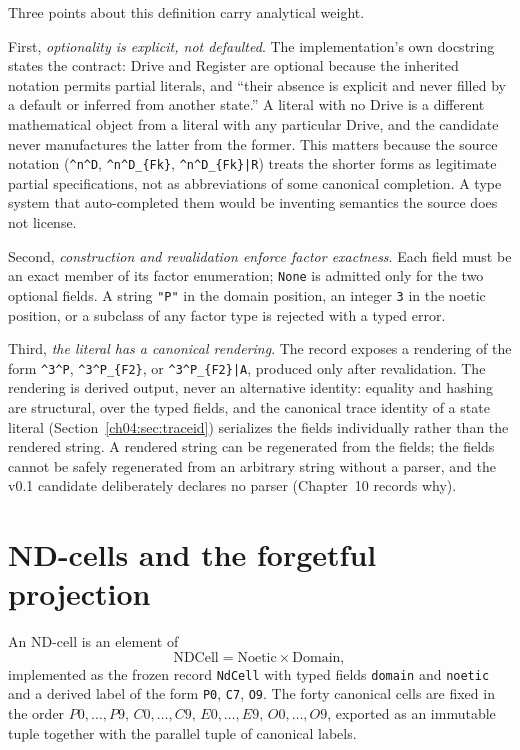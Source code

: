 Three points about this definition carry analytical weight.

First, \emph{optionality is explicit, not defaulted}. The implementation's
own docstring states the contract: Drive and Register are optional because
the inherited notation permits partial literals, and ``their absence is
explicit and never filled by a default or inferred from another state.''
A literal with no Drive is a different mathematical object from a literal
with any particular Drive, and the candidate never manufactures the latter
from the former. This matters because the source notation
(\texttt{\^{}n\^{}D}, \texttt{\^{}n\^{}D\_\{Fk\}},
\texttt{\^{}n\^{}D\_\{Fk\}|R}) treats the shorter forms as legitimate
partial specifications, not as abbreviations of some canonical completion.
A type system that auto-completed them would be inventing semantics the
source does not license.

Second, \emph{construction and revalidation enforce factor exactness}. Each
field must be an exact member of its factor enumeration; \texttt{None} is
admitted only for the two optional fields. A string \texttt{"P"} in the
domain position, an integer \texttt{3} in the noetic position, or a
subclass of any factor type is rejected with a typed error.

Third, \emph{the literal has a canonical rendering}. The record exposes a
rendering of the form \texttt{\^{}3\^{}P}, \texttt{\^{}3\^{}P\_\{F2\}}, or
\texttt{\^{}3\^{}P\_\{F2\}|A}, produced only after revalidation. The
rendering is derived output, never an alternative identity: equality and
hashing are structural, over the typed fields, and the canonical trace
identity of a state literal (Section~\ref{ch04:sec:traceid}) serializes the
fields individually rather than the rendered string. A rendered string can
be regenerated from the fields; the fields cannot be safely regenerated
from an arbitrary string without a parser, and the v0.1 candidate
deliberately declares no parser (Chapter~10 records why).

\section{ND-cells and the forgetful projection}\label{ch04:sec:ndcells}

\begin{definition}[ND-cell]\label{ch04:def:ndcell}
An ND-cell is an element of
\[
\mathrm{NDCell} = \mathrm{Noetic} \times \mathrm{Domain},
\]
implemented as the frozen record \texttt{NdCell} with typed fields
\texttt{domain} and \texttt{noetic} and a derived label of the form
\texttt{P0}, \texttt{C7}, \texttt{O9}. The forty canonical cells are fixed
in the order $P0,\ldots,P9,\,C0,\ldots,C9,\,E0,\ldots,E9,\,O0,\ldots,O9$,
exported as an immutable tuple together with the parallel tuple of canonical
labels.
\end{definition}

